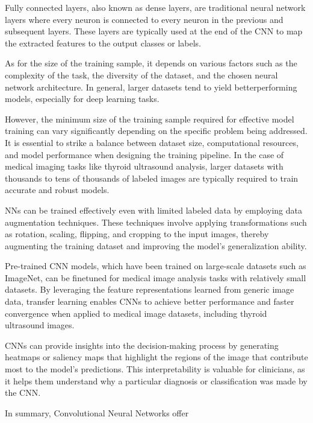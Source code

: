 \documentclass{article}
\begin{document}
\par Fully connected layers, also known as dense layers, are
traditional neural network layers where every neuron is
connected to every neuron in the previous and subsequent
layers. These layers are typically used at the end of the
CNN to map the extracted features to the output classes
or labels.

\par As for the size of the training sample, it depends on
various factors such as the complexity of the task, the
diversity of the dataset, and the chosen neural network architecture. In general, larger datasets tend to yield betterperforming models, especially for deep learning tasks.

\par However, the minimum size of the training sample required for effective model training can vary significantly
\newpage
\noindent depending on the specific problem being addressed. It
is essential to strike a balance between dataset size,
computational resources, and model performance when
designing the training pipeline. In the case of medical
imaging tasks like thyroid ultrasound analysis, larger
datasets with thousands to tens of thousands of labeled
images are typically required to train accurate and robust
models.
\par NNs can be trained effectively even with limited
labeled data by employing data augmentation techniques.
These techniques involve applying transformations such
as rotation, scaling, flipping, and cropping to the input
images, thereby augmenting the training dataset and
improving the model’s generalization ability.
\par Pre-trained CNN models, which have been trained
on large-scale datasets such as ImageNet, can be finetuned for medical image analysis tasks with relatively
small datasets. By leveraging the feature representations
learned from generic image data, transfer learning enables CNNs to achieve better performance and faster
convergence when applied to medical image datasets,
including thyroid ultrasound images.
\par CNNs can provide insights into the decision-making
process by generating heatmaps or saliency maps that
highlight the regions of the image that contribute most
to the model’s predictions. This interpretability is valuable for clinicians, as it helps them understand why a
particular diagnosis or classification was made by the
CNN.
\par In summary, Convolutional Neural Networks offer
\end{document}
